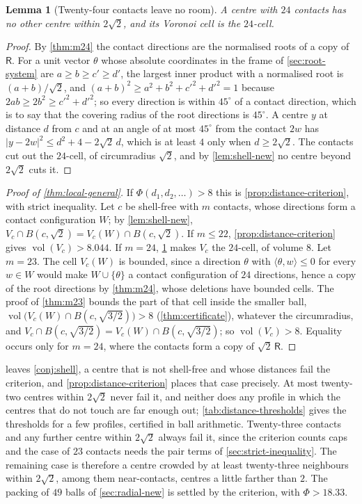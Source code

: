 \documentclass[11pt,reqno]{amsart}
\renewcommand{\_}{\origunderscore\allowbreak}
\numberwithin{equation}{section}
\theoremstyle{plain}
\newtheorem{lem}[thm]{Lemma}
\theoremstyle{definition}
\theoremstyle{remark}
\newcommand{\Rt}{\mathsf{R}}                 %
\DeclareMathOperator{\vol}{vol}
\begin{document}
\begin{lem}[Twenty-four contacts leave no room]\label{lem:24-no-shell}
A centre with $24$ contacts has no other centre within $2\sqrt2$, and its
Voronoi cell is the $24$-cell.
\end{lem}

\begin{proof}
By \cref{thm:m24} the contact directions are the normalised roots of a
copy of $\Rt$. For a unit vector $\theta$ whose absolute coordinates in
the frame of \cref{sec:root-system} are $a\ge b\ge c'\ge d'$, the largest
inner product with a normalised root is $(a+b)/\sqrt2$, and
$(a+b)^2\ge a^2+b^2+c'^2+d'^2=1$ because $2ab\ge2b^2\ge c'^2+d'^2$; so
every direction is within $45^\circ$ of a contact direction, which is to
say that the covering radius of the root directions is $45^\circ$. A
centre $y$ at distance $d$ from $c$ and at an angle of at most $45^\circ$
from the contact $2w$ has $|y-2w|^2\le d^2+4-2\sqrt2\,d$, which is at
least $4$ only when $d\ge2\sqrt2$. The contacts cut out the $24$-cell,
of circumradius $\sqrt2$, and by \cref{lem:shell-new} no centre beyond
$2\sqrt2$ cuts it.
\end{proof}

\begin{proof}[Proof of \cref{thm:local-general}]
If $\Phi(d_1,d_2,\dots)>8$ this is \cref{prop:distance-criterion}, with
strict inequality. Let $c$ be shell-free with $m$ contacts, whose
directions form a contact configuration $W$; by \cref{lem:shell-new},
$V_c\cap B(c,\sqrt2)=V_c(W)\cap B(c,\sqrt2)$. If $m\le22$,
\cref{prop:distance-criterion} gives $\vol(V_c)>8.044$. If $m=24$,
\cref{lem:24-no-shell} makes $V_c$ the $24$-cell, of volume $8$. Let
$m=23$. The cell $V_c(W)$ is bounded, since a direction $\theta$ with
$\langle\theta,w\rangle\le0$ for every $w\in W$ would make $W\cup\{\theta\}$
a contact configuration of $24$ directions, hence a copy of the root
directions by \cref{thm:m24}, whose deletions have bounded cells. The
proof of \cref{thm:m23} bounds the part of that cell inside the smaller
ball, $\vol\bigl(V_c(W)\cap B(c,\sqrt{3/2})\bigr)>8$
(\cref{thm:certificate}), whatever the circumradius, and
$V_c\cap B(c,\sqrt{3/2})=V_c(W)\cap B(c,\sqrt{3/2})$; so
$\vol(V_c)>8$. Equality occurs only for $m=24$, where the contacts form
a copy of $\sqrt2\,\Rt$.
\end{proof}

 leaves \cref{conj:shell}, a centre that is not
shell-free and whose distances fail the criterion, and
\cref{prop:distance-criterion} places that case precisely. At most
twenty-two centres within $2\sqrt2$ never fail it, and neither does any
profile in which the centres that do not touch are far enough out;
\cref{tab:distance-thresholds} gives the thresholds for a few profiles,
certified in ball arithmetic. Twenty-three
contacts and any further centre within $2\sqrt2$ always fail it, since
the criterion counts caps and the case of $23$ contacts needs the pair
terms of \cref{sec:strict-inequality}. The remaining case is therefore a
centre crowded by at least twenty-three neighbours within $2\sqrt2$,
among them near-contacts, centres a little farther than $2$. The
packing of $49$ balls of \cref{sec:radial-new} is settled by the
criterion, with $\Phi>18.33$.
\end{document}
